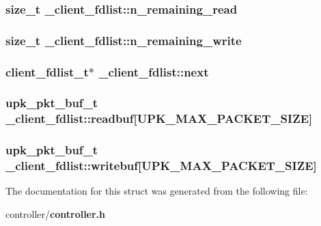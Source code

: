 \subsubsection{\setlength{\rightskip}{0pt plus 5cm}size\_\-t \bf{\_\-client\_\-fdlist::n\_\-remaining\_\-read}}\label{struct__client__fdlist_dff8022446315e09497e1553eef7dcca}


\subsubsection{\setlength{\rightskip}{0pt plus 5cm}size\_\-t \bf{\_\-client\_\-fdlist::n\_\-remaining\_\-write}}\label{struct__client__fdlist_74346e00455225480f18384c7077d007}


\subsubsection{\setlength{\rightskip}{0pt plus 5cm}\bf{client\_\-fdlist\_\-t}$\ast$ \bf{\_\-client\_\-fdlist::next}}\label{struct__client__fdlist_e727b971d27de2503da381fc6c460208}


\subsubsection{\setlength{\rightskip}{0pt plus 5cm}\bf{upk\_\-pkt\_\-buf\_\-t} \bf{\_\-client\_\-fdlist::readbuf}[UPK\_\-MAX\_\-PACKET\_\-SIZE]}\label{struct__client__fdlist_07919147ca35603575d7e081659e3130}


\subsubsection{\setlength{\rightskip}{0pt plus 5cm}\bf{upk\_\-pkt\_\-buf\_\-t} \bf{\_\-client\_\-fdlist::writebuf}[UPK\_\-MAX\_\-PACKET\_\-SIZE]}\label{struct__client__fdlist_9c4e673e3baf5b241bef934d8d3c88de}




The documentation for this struct was generated from the following file:\begin{CompactItemize}
\item 
controller/\bf{controller.h}\end{CompactItemize}

